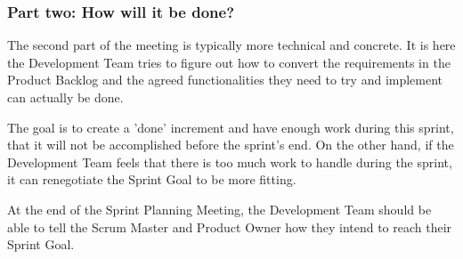 \subsubsection{Part two: How will it be done?}


The second part of the meeting is typically more technical and concrete. It is here the Development Team tries to figure out how to convert the requirements in the Product Backlog and the agreed functionalities they need to try and implement can actually be done\cite{scrumguide11}. 


The goal is to create a 'done' increment and have enough work during this sprint, that it will not be accomplished before the sprint's end\cite{scrumguide11}. On the other hand, if the Development Team feels that there is too much work to handle during the sprint, it can renegotiate the Sprint Goal to be more fitting\cite{scrumguide11}.


At the end of the Sprint Planning Meeting, the Development Team should be able to tell the Scrum Master and Product Owner how they intend to reach their Sprint Goal.